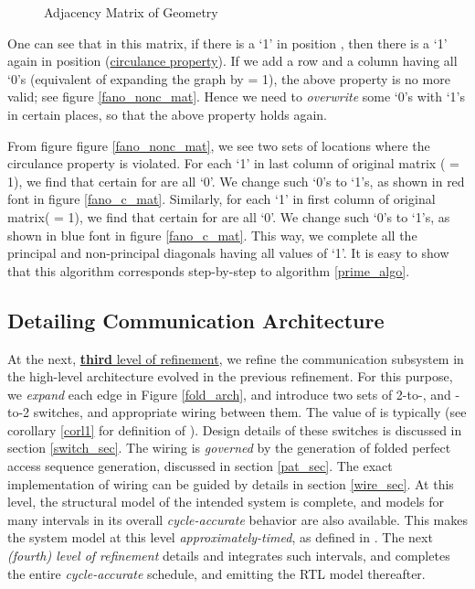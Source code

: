 \documentclass[12pt]{article}
\begin{document}
\begin{figure}[h]
\begin{center}
\qquad
{}
\qquad
{}
\end{center}
\caption{Adjacency Matrix of  Geometry}
\label{appB_1_fig}
\end{figure}
One can see that in this matrix, if there is a `1' in position , then there is a `1' again in position  (\uline{circulance property}). If we add a
row and a column having all `0's (equivalent of expanding the graph by
 = 1), the above property is no more valid; see figure
\ref{fano_nonc_mat}. Hence we need to \textit{overwrite} some `0's with
`1's in certain places, so that the above property holds again.

From figure figure \ref{fano_nonc_mat}, we see two sets of locations where
the circulance property is violated. For each `1' in last column of
original matrix ( = 1), we find that certain  for  are all `0'. We change such
`0's to `1's, as shown in red font in figure \ref{fano_c_mat}. Similarly,
for each `1' in first column of original matrix( = 1), we find
that certain  for  are all `0'. We change such `0's to `1's, as shown in blue font in
figure \ref{fano_c_mat}. This way, we complete all the principal and
non-principal diagonals having all values of `1'. It is easy to show that
this algorithm corresponds step-by-step to algorithm \ref{prime_algo}.

\subsection{Detailing Communication Architecture}
\label{comm_detail_sec}
At the next, \uline{\textbf{third} level of refinement}, we refine the
communication subsystem in the high-level architecture evolved in the
previous refinement. For this purpose, we \textit{expand} each edge in
Figure \ref{fold_arch}, and introduce two sets of 2-to-, and
-to-2 switches, and appropriate wiring between them. The
value of  is typically  (see corollary \ref{corl1} for
definition of ).
Design details of these switches is discussed in
section \ref{switch_sec}. The wiring is \textit{governed}
by the generation of folded perfect access sequence generation, discussed
in section \ref{pat_sec}. The exact implementation of wiring can be guided by
details in section \ref{wire_sec}. At this level, the structural model of
the intended system is complete, and models for many intervals in its
overall \textit{cycle-accurate} behavior are also available.
This makes the system model at this level
\textit{approximately-timed}, as defined in \cite{gajski_tlm_pap}. The next
\textit{(fourth)
level of refinement} details and integrates such intervals, and completes
the entire \textit{cycle-accurate} schedule, and emitting the RTL model
thereafter.
\end{document}
